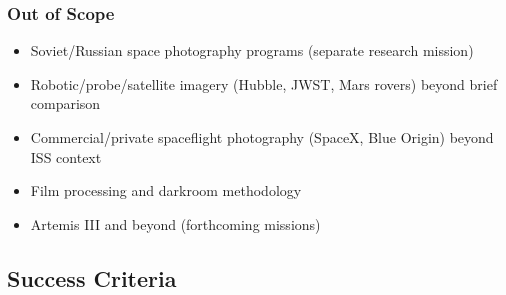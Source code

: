 \documentclass[11pt,letterpaper]{article}
\begin{document}
\subsubsection{Out of Scope}
\begin{itemize}[leftmargin=1.5em]
  \item Soviet/Russian space photography programs (separate research mission)
  \item Robotic/probe/satellite imagery (Hubble, JWST, Mars rovers) beyond brief comparison
  \item Commercial/private spaceflight photography (SpaceX, Blue Origin) beyond ISS context
  \item Film processing and darkroom methodology
  \item Artemis III and beyond (forthcoming missions)
\end{itemize}

\subsection{Success Criteria}
\end{document}
